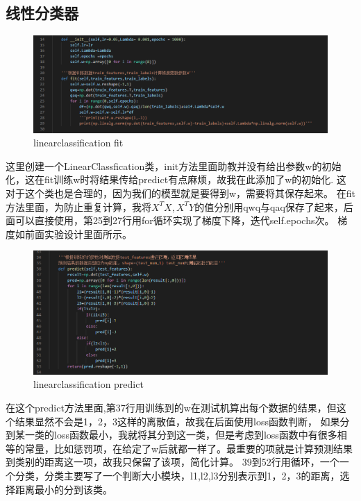 \documentclass{report}
\begin{document}
    \subsection{线性分类器}
    \begin{figure}[H]
        \centering
        \includegraphics[width=15cm]{1.png}
        \caption{linearclassification fit}
    \end{figure}
    这里创建一个LinearClassfication类，init方法里面助教并没有给出参数w的初始化，这在fit训练w时将结果传给predict有点麻烦，故我在此添加了w的初始化.
    这对于这个类也是合理的，因为我们的模型就是要得到w，需要将其保存起来。
    在fit方法里面，为防止重复计算，我将$X^TX,X^TY$的值分别用qwq与qaq保存了起来，后面可以直接使用，第25到27行用for循环实现了梯度下降，迭代self.epochs次。
    梯度如前面实验设计里面所示。\par 
    \begin{figure}[H]
        \centering
        \includegraphics[width=15cm]{2.png}
        \caption{linearclassification predict}
    \end{figure}
    在这个predict方法里面,第37行用训练到的w在测试机算出每个数据的结果，但这个结果显然不会是1，2，3这样的离散值，故我在后面使用loss函数判断，
    如果分到某一类的loss函数最小，我就将其分到这一类，但是考虑到loss函数中有很多相等的常量，比如惩罚项，在给定了w后就都一样了。最重要的项就是计算预测结果到类别的距离这一项，故我只保留了该项，简化计算。
    39到52行用循环，一个一个分类，分类主要写了一个判断大小模块，l1,l2,l3分别表示到1，2，3的距离，选择距离最小的分到该类。\par 
\end{document}
